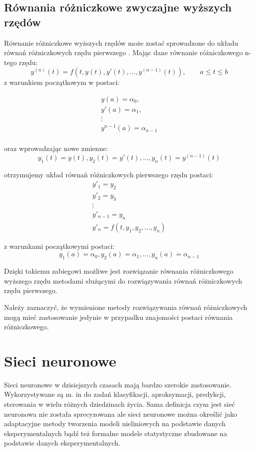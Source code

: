 \subsection*{Równania różniczkowe zwyczajne wyższych rzędów}
Równanie różniczkowe wyższych rzędów może zostać sprowadzone do układu równań różniczkowych rzędu pierwszego \cite{AK_RBG2002}. Mając dane równanie różniczkowego n-tego rzędu:
$$y^{(n)}(t) = f(t,y(t),y'(t),\hdots,y^{(n-1)}(t)), \qquad a \leq t \leq b$$
z warunkiem początkowym w postaci:

$$\begin{array}{c}
y(a)       = \alpha_0,    \\
y'(a)      = \alpha_1,    \\
\vdots					  \\
y^{n-1}(a) = \alpha_{n-1} \\
\end{array}$$

oraz wprowadzając nowe zmienne:
$$y_1(t) = y(t), y_2(t) = y'(t), \hdots, y_n(t) = y^{(n-1)}(t)$$

otrzymujemy układ równań różniczkowych pierwszego rzędu postaci:
$$\begin{array}{l}
y'_1       = y_2   \\
y'_2       = y_3   \\
\vdots			   \\
y'_{n-1} = y_n     \\
y'_n = f(t,y_1,y_2,\hdots,y_n)
\end{array}$$

z warunkami początkowymi postaci:
$$y_1(a) = \alpha_0, y_2(a) = \alpha_1, \hdots, y_n(a) = \alpha_{n-1}$$

Dzięki takiemu zabiegowi możliwe jest rozwiązanie równania różniczkowego wyższego rzędu metodami służącymi do rozwiązywania równań różniczkowych rzędu pierwszego.

Należy zaznaczyć, że wymienione metody rozwiązywania równań różniczkowych mogą mieć zastosowanie jedynie w przypadku znajomości postaci równania różniczkowego.
 
\newpage
\section{Sieci neuronowe} 

Sieci neuronowe w dzisiejszych czasach mają bardzo szerokie zastosowanie. Wykorzystywane są m. in do zadań klasyfikacji, aproksymacji, predykcji, sterowania w wielu różnych dziedzinach życia. Sama definicja czym jest sieć neuronowa nie została sprecyzowana ale sieci neuronowe można określić jako adaptacyjne metody tworzenia modeli nieliniowych na podstawie danych eksperymentalnych bądź też formalne modele statystyczne zbudowane na podstawie danych eksperymentalnych\cite{Jankowski}.
 
